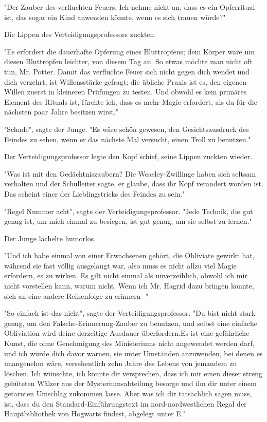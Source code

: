 {"Der Zauber des verfluchten Feuers. Ich nehme nicht an, dass es ein Opferritual ist, das sogar ein Kind anwenden könnte, wenn es sich trauen würde?"

Die Lippen des Verteidigungsprofessors zuckten.

"Es erfordert die dauerhafte Opferung eines Bluttropfens; dein Körper wäre um diesen Bluttropfen leichter, von diesem Tag an. So etwas möchte man nicht oft tun, Mr. Potter. Damit das verfluchte Feuer sich nicht gegen dich wendet und dich verzehrt, ist Willensstärke gefragt; die übliche Praxis ist es, den eigenen Willen zuerst in kleineren Prüfungen zu testen. Und obwohl es kein primäres Element des Rituals ist, fürchte ich, dass es mehr Magie erfordert, als du für die nächsten paar Jahre besitzen wirst."

"Schade", sagte der Junge. "Es wäre schön gewesen, den Gesichtsausdruck des Feindes zu sehen, wenn er das nächste Mal versucht, einen Troll zu benutzen."

Der Verteidigungsprofessor legte den Kopf schief, seine Lippen zuckten wieder.

"Was ist mit den Gedächtniszaubern? Die Weasley-Zwillinge haben sich seltsam verhalten und der Schulleiter sagte, er glaube, dass ihr Kopf verändert worden ist. Das scheint einer der Lieblingstricks des Feindes zu sein."

"Regel Nummer acht", sagte der Verteidigungsprofessor. "Jede Technik, die gut genug ist, um mich einmal zu besiegen, ist gut genug, um sie selbst zu lernen."

Der Junge lächelte humorlos.

"Und ich habe einmal von einer Erwachsenen gehört, die Obliviate gewirkt hat, während sie fast völlig ausgelaugt war, also muss es nicht allzu viel Magie erfordern, es zu wirken. Es gilt nicht einmal als unverzeihlich, obwohl ich mir nicht vorstellen kann, warum nicht. Wenn ich Mr. Hagrid dazu bringen könnte, sich an eine andere Reihenfolge zu erinnern -"

"So einfach ist das nicht", sagte der Verteidigungsprofessor. "Du bist nicht stark genug, um den Falsche-Erinnerung-Zauber zu benutzen, und selbst eine einfache Obliviation wird deine derzeitige Ausdauer überfordern.Es ist eine gefährliche Kunst, die ohne Genehmigung des Ministeriums nicht angewendet werden darf, und ich würde dich davor warnen, sie unter Umständen anzuwenden, bei denen es unangenehm wäre, versehentlich zehn Jahre des Lebens von jemandem zu löschen. Ich wünschte, ich könnte dir versprechen, dass ich mir einen dieser streng gehüteten Wälzer aus der Mysteriumsabteilung besorge und ihn dir unter einem getarnten Umschlag zukommen lasse. Aber was ich dir tatsächlich sagen muss, ist, dass du den Standard-Einführungstext im nord-nordwestlichen Regal der Hauptbibliothek von Hogwarts findest, abgelegt unter E."

}
